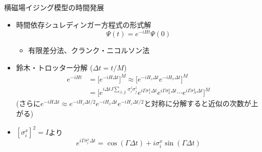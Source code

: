 \begin{frame}[t,fragile]{横磁場イジング模型の時間発展}
  \begin{itemize}
  \item 時間依存シュレディンガー方程式の形式解
    \[
    \Psi(t) = e^{-iHt} \Psi(0)
    \]
    \begin{itemize}
    \item 有限差分法、クランク・ニコルソン法
    \end{itemize}
  \item 鈴木・トロッター分解 ($\Delta t = t / M$)
    \begin{align*}
      e^{-iHt} &= \big[ e^{-iH\Delta t} \big]^M \approx \big[ e^{-iH_z\Delta t} e^{-iH_x\Delta t} \big]^M \\
      &= \big[ e^{i\Delta t J \sum_{\langle i,j \rangle} \sigma_i^z \sigma_j^z} e^{i\Gamma \sigma_1^x\Delta t} e^{i\Gamma \sigma_2^x\Delta t} \cdots e^{i\Gamma \sigma_N^x\Delta t} \big]^M
    \end{align*}
    (さらに$e^{-iH\Delta t} \approx e^{-iH_z\Delta t/2} e^{-iH_x\Delta t} e^{-iH_z\Delta t/2}$と対称に分解すると近似の次数が上がる)
  \item $[\sigma_i^x]^2 = I$より
    \[
    e^{i\Gamma \sigma_i^x\Delta t} = \cos (\Gamma\Delta t) + i \sigma_i^x \sin (\Gamma\Delta t)
    \]
  \end{itemize}
\end{frame}
